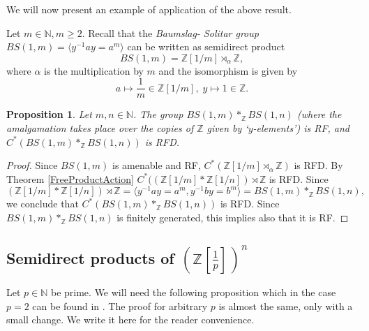 \documentclass[11 pt, leqno, hidelinks]{amsart}%
\theoremstyle{plain}
\newtheorem{proposition}[theorem]{Proposition}
\numberwithin{equation}{section}
\newcommand{\N}{\mathbb{N}}
\newcommand{\Z}{\mathbb{Z}}
\begin{document}
We will now present an example of application of the above result.

Let $m \in \N, m \geq 2$. Recall that the \emph{Baumslag- Solitar group} $BS(1, m)= \langle y^{-1}ay= a^m\rangle$ can be written as semidirect product
$$BS(1, m) = \mathbb Z[1/m]\rtimes _{\alpha} \mathbb Z,$$ where $\alpha$ is the multiplication by $m$ and the isomorphism is given by
$$a\mapsto \frac{1}{m}\in \mathbb Z[1/m], \; y \mapsto 1\in \mathbb Z.$$

\begin{proposition}
Let $m, n \in \N$. The group  $BS(1, m) \ast_{\mathbb Z} BS(1, n)$ (where the amalgamation takes place over the copies of $\Z$ given by `$y$-elements') is RF, and $C^*(BS(1, m) \ast_{\mathbb Z} BS(1, n))$ is RFD.
\end{proposition}

\begin{proof}
Since $BS(1, m)$ is amenable and RF, $C^*(\mathbb Z[1/m]\rtimes _{\alpha} \mathbb Z)$ is RFD. By Theorem \ref{FreeProductAction} $C^*((\mathbb Z[1/m]\ast \mathbb Z[1/n])\rtimes \mathbb Z$ is RFD. Since
$$(\mathbb Z[1/m]\ast \mathbb Z[1/n])\rtimes \mathbb Z = \langle y^{-1}ay = a^m, y^{-1}by = b^m\rangle = BS(1, m)\ast_{\mathbb Z} BS(1,n),$$
we conclude  that
	$C^*(BS(1, m) \ast_{\mathbb Z} BS(1, n))$ is RFD. Since $BS(1, m) \ast_{\mathbb Z} BS(1, n)$ is finitely generated, this implies also that it is RF.
\end{proof}








\bigskip


\subsection{Semidirect products of  $\left(\mathbb Z[\frac{1}{p}]\right)^n$}


Let $p\in \mathbb N$ be prime.
We will need the following proposition which in the case $p=2$ can be found in  \cite[Lemma 5.6]{ES}. The proof for arbitrary $p$ is  almost the same, only with a small change. We write it here for the reader convenience.
\end{document}
